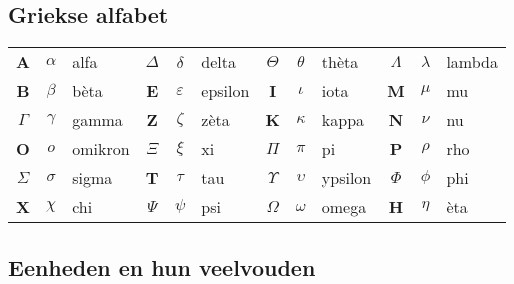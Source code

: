 \documentclass[a5paper]{article}
\begin{document}
\subsection{Griekse alfabet}

\begin{center}
\renewcommand{\arraystretch}{1.1}
\setlength{\tabcolsep}{4pt} %
\begin{tabular}{|
  >{\bfseries}c c l | %
  >{\bfseries}c c l | %
  >{\bfseries}c c l | %
  >{\bfseries}c c l | %
}
A & $\alpha$ & alfa &
$\Delta$ & $\delta$ & delta &
$\Theta$ & $\theta$ & thèta &
$\Lambda$ & $\lambda$ & lambda \\

B & $\beta$ & bèta &
E & $\varepsilon$ & epsilon &
I & $\iota$ & iota &
M & $\mu$ & mu \\

$\Gamma$ & $\gamma$ & gamma &
Z & $\zeta$ & zèta &
K & $\kappa$ & kappa &
N & $\nu$ & nu \\

O & $o$ & omikron &
$\Xi$ & $\xi$ & xi &
$\Pi$ & $\pi$ & pi &
P & $\rho$ & rho \\

$\Sigma$ & $\sigma$ & sigma &
T & $\tau$ & tau &
$\Upsilon$ & $\upsilon$ & ypsilon &
$\Phi$ & $\phi$ & phi \\

X & $\chi$ & chi &
$\Psi$ & $\psi$ & psi &
$\Omega$ & $\omega$ & omega &
H & $\eta$ & èta \\
\end{tabular}
\end{center}

\subsection{Eenheden en hun veelvouden}
\end{document}
